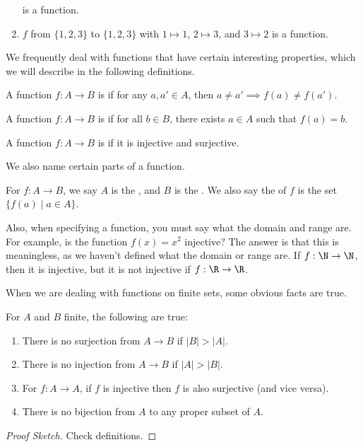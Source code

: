 \documentclass[a4paper]{scrreprt}
\begin{document}
\begin{example}
\begin{enumerate}[label=(\roman*)]
\begin{center}
\begin{tikzpicture}[x=0.75pt,y=0.75pt,yscale=-1,xscale=1]
\end{tikzpicture}

		\end{center}
		is a function.
	
	\item $f$ from $\{1, 2, 3\}$ to $\{1, 2, 3\}$ with $1 \mapsto 1$, $2 \mapsto 3$, and $3 \mapsto 2$ is a function.
\end{enumerate}
\end{example}

We frequently deal with functions that have certain interesting properties, which we will describe in the following definitions.

\begin{definition}[Injectivity]
	A function $f: A \rightarrow B$ is  if for any $a, a' \in A$, then $a \neq a' \implies f(a) \neq f(a')$.
\end{definition}
\begin{definition}[Surjectivity]
	A function $f : A \rightarrow B$ is  if for all $b \in B$, there exists $a \in A$ such that $f(a) = b$.
\end{definition}
\begin{definition}[Bijectivity]
	A function $f: A \rightarrow B$ is  if it is injective and surjective.
\end{definition}

We also name certain parts of a function.
\begin{definition}
	For $f: A \rightarrow B$, we say $A$ is the , and $B$ is the . We also say the  of $f$ is the set $\{f(a) \mid a \in A\}$.
\end{definition}
Also, when specifying a function, you must say what the domain and range are. For example, is the function $f(x) = x^2$ injective? The answer is that this is meaningless, as we haven't defined what the domain or range are. If $f : \N \rightarrow \N$, then it is injective, but it is not injective if $f: \R \rightarrow \R$.

When we are dealing with functions on finite sets, some obvious facts are true.
\begin{proposition}
	For $A$ and $B$ finite, the following are true:
	\begin{enumerate}[label=(\roman*)]
		\item There is no surjection from $A \rightarrow B$ if $|B| > |A|$.
		\item There is no injection from $A \rightarrow B$ if $|A| > |B|$.
		\item For $f: A \rightarrow A$, if $f$ is injective then $f$ is also surjective (and vice versa).
		\item There is no bijection from $A$ to any proper subset of $A$.
	\end{enumerate}
\end{proposition}
\begin{proof}[Proof Sketch]
	Check definitions.
\end{proof}
\end{document}
